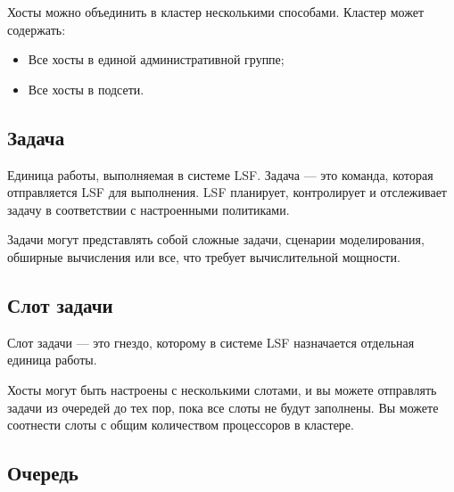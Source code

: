 Хосты можно объединить в кластер несколькими способами. Кластер может содержать:

\begin{itemize}
    \item Все хосты в единой административной группе;
    \item Все хосты в подсети.
\end{itemize}

\subsection{Задача}

Единица работы, выполняемая в системе LSF. Задача --- это команда, которая отправляется LSF для выполнения. LSF планирует, контролирует и отслеживает задачу в соответствии с настроенными политиками.

Задачи могут представлять собой сложные задачи, сценарии моделирования, обширные вычисления или все, что требует вычислительной мощности.

\subsection{Слот задачи}

Слот задачи --- это гнездо, которому в системе LSF назначается отдельная единица работы.

Хосты могут быть настроены с несколькими слотами, и вы можете отправлять задачи из очередей до тех пор, пока все слоты не будут заполнены. Вы можете соотнести слоты с общим количеством процессоров в кластере.

\subsection{Очередь}

